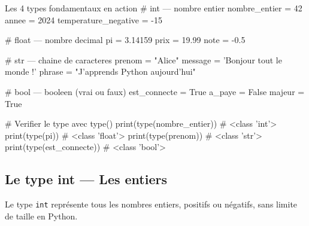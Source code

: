 \documentclass[12pt, a4paper]{article}
\begin{document}
\vspace{0.5cm}

\begin{center}
\end{center}

\vspace{0.5cm}

\begin{codeblock}{Les 4 types fondamentaux en action}
# int — nombre entier
nombre_entier = 42
annee = 2024
temperature_negative = -15

# float — nombre decimal
pi = 3.14159
prix = 19.99
note = -0.5

# str — chaine de caracteres
prenom = "Alice"
message = 'Bonjour tout le monde !'
phrase = "J'apprends Python aujourd'hui"

# bool — booleen (vrai ou faux)
est_connecte = True
a_paye = False
majeur = True

# Verifier le type avec type()
print(type(nombre_entier))   # <class 'int'>
print(type(pi))              # <class 'float'>
print(type(prenom))          # <class 'str'>
print(type(est_connecte))    # <class 'bool'>
\end{codeblock}

\subsection{Le type int — Les entiers}

Le type \texttt{int} représente tous les nombres entiers, positifs ou négatifs, sans limite de taille en Python.
\end{document}
